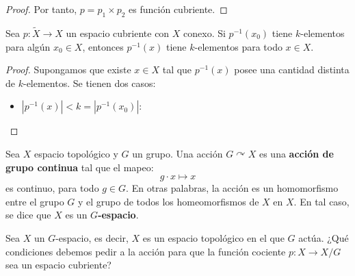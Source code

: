 \documentclass[12pt]{report}
\newcounter{it}
\theoremstyle{largebreak}
\newcommand\abs[1]{\ensuremath{\left|#1\right|}}
\newcommand\cf[3]{\ensuremath{#1:#2\rightarrow#3}}
\begin{document}
\begin{proof}
        Por tanto, $p=p_1\times p_2$ es función cubriente.
    \end{proof}

    \begin{excer}
        Sea $\cf{p}{\widetilde{X}}{X}$ un espacio cubriente con $X$ conexo. Si $p^{-1}(x_0)$ tiene $k$-elementos para algún $x_0\in X$, entonces $p^{-1}(x)$ tiene $k$-elementos para todo $x\in X$.
    \end{excer}

    \begin{proof}
        Supongamos que existe $x\in X$ tal que $p^{-1}(x)$ posee una cantidad distinta de $k$-elementos. Se tienen dos casos:
        \begin{itemize}
            \item $\abs{p^{-1}(x)}<k=\abs{p^{-1}(x_0)}$: 
        \end{itemize}
    \end{proof}

    \newcommand{\Hom}[1]{\ensuremath{\textup{Hom}\left(#1\right)}}

    \begin{mydef}
        Sea $X$ espacio topológico y $G$ un grupo. Una acción $G\curvearrowright X$ es una \textbf{acción de grupo continua} tal que el mapeo:
        \begin{equation*}
            g\cdot x\mapsto x
        \end{equation*}
        es continuo, para todo $g\in G$. En otras palabras, la acción es un homomorfismo entre el grupo $G$ y el grupo de todos los homeomorfismos de $X$ en $X$. En tal caso, se dice que $X$ es un \textbf{$G$-espacio}.
    \end{mydef}

    \begin{excer}
        Sea $X$ un $G$-espacio, es decir, $X$ es un espacio topológico en el que $G$ actúa. ¿Qué condiciones debemos pedir a la acción para que la función cociente $\cf{p}{X}{X/G}$ sea un espacio cubriente?
    \end{excer}
\end{document}
